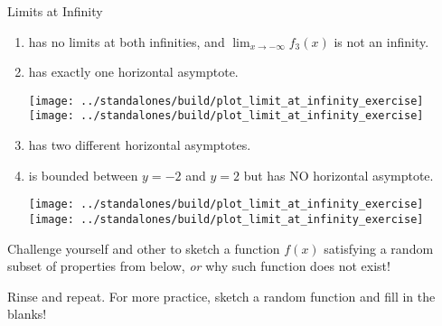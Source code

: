 \documentclass[../main.tex]{subfiles}
\begin{document}
\begin{lesson}{Limits at Infinity}
\begin{example}
\begin{enumerate}[label=\(f_{\arabic*}\)]
      \item has no limits at both infinities, and \(\lim_{x \to -\infty} f_{3}(x)\) is not an infinity. 
      \item has exactly one horizontal asymptote.

        \begin{center}
          \texttt{[image: ../standalones/build/plot\_limit\_at\_infinity\_exercise]}
          \qquad
          \texttt{[image: ../standalones/build/plot\_limit\_at\_infinity\_exercise]}
        \end{center}

      \item has two different horizontal asymptotes.
      \item is bounded between \(y = -2\) and \(y = 2\) but has NO horizontal asymptote.

        \begin{center}
          \texttt{[image: ../standalones/build/plot\_limit\_at\_infinity\_exercise]}
          \qquad
          \texttt{[image: ../standalones/build/plot\_limit\_at\_infinity\_exercise]}
        \end{center}
    \end{enumerate}

  \end{example}
  \clearpage

  \begin{example}
    Challenge yourself and other to sketch a function \(f(x)\) satisfying a random subset of properties from below, \emph{or}  why such function does not exist!

    Rinse and repeat. For more practice, sketch a random function and fill in the blanks! 


\end{example}
\end{lesson}
\end{document}

